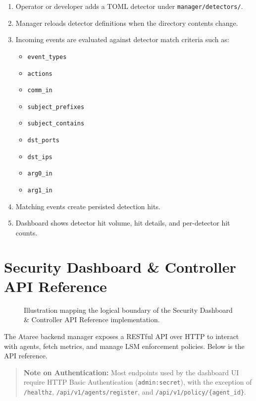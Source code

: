\documentclass[
  12pt,
]{report}
\providecommand{\tightlist}{%
  \setlength{\itemsep}{0pt}\setlength{\parskip}{0pt}}
\begin{document}
\begin{enumerate}
\def\labelenumi{\arabic{enumi}.}
\tightlist
\item
  Operator or developer adds a TOML detector under
  \texttt{manager/detectors/}.
\item
  Manager reloads detector definitions when the directory contents
  change.
\item
  Incoming events are evaluated against detector match criteria such as:

  \begin{itemize}
  \tightlist
  \item
    \texttt{event\_types}
  \item
    \texttt{actions}
  \item
    \texttt{comm\_in}
  \item
    \texttt{subject\_prefixes}
  \item
    \texttt{subject\_contains}
  \item
    \texttt{dst\_ports}
  \item
    \texttt{dst\_ips}
  \item
    \texttt{arg0\_in}
  \item
    \texttt{arg1\_in}
  \end{itemize}
\item
  Matching events create persisted detection hits.
\item
  Dashboard shows detector hit volume, hit details, and per-detector hit
  counts.
\end{enumerate}

\clearpage

\chapter{Security Dashboard \& Controller API
Reference}\label{security-dashboard-controller-api-reference}

\begin{figure}[h]
\centering
\vspace{5cm}
\caption{Illustration mapping the logical boundary of the Security Dashboard & Controller API Reference implementation.}
\end{figure}

The Ataree backend manager exposes a RESTful API over HTTP to interact
with agents, fetch metrics, and manage LSM enforcement policies. Below
is the API reference.

\begin{quote}
\textbf{Note on Authentication:} Most endpoints used by the dashboard UI
require HTTP Basic Authentication (\texttt{admin:secret}), with the
exception of \texttt{/healthz}, \texttt{/api/v1/agents/register}, and
\texttt{/api/v1/policy/\{agent\_id\}}.
\end{quote}
\end{document}
